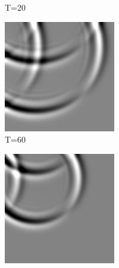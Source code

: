 \documentclass[a4paper,11pt]{article}
\begin{document}
\begin{figure}[ht]
\begin{center}
\begin{minipage}[t]{.59\linewidth}
\begin{subfigure}{.33\textwidth}
  \caption{T=20}
  \label{fig:sub2}
\end{subfigure}
\begin{subfigure}{.33\textwidth}
  \includegraphics[width=.95\linewidth]{images/img060.jpg}
  \caption{T=60}
  \label{fig:sub3}
\end{subfigure}
\caption{Wave at different time steps T}
\label{fig:evol}
\end{minipage}
\begin{minipage}[t]{.38\linewidth}
\begin{subfigure}{.5\textwidth}
  \includegraphics[width=.95\linewidth]{images/solid.jpg}

\end{subfigure}
\end{minipage}
\end{center}
\end{figure}
\end{document}
